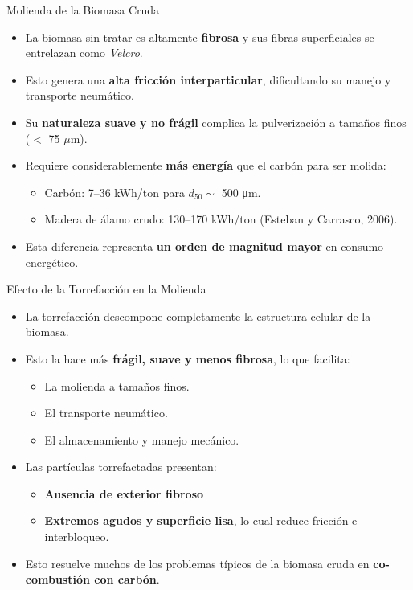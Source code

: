 \documentclass[main.tex]{subfiles}
\begin{document}
\begin{frame}{Molienda de la Biomasa Cruda}
\small
\begin{itemize}
    \item La biomasa sin tratar es altamente \textbf{fibrosa} y sus fibras superficiales se entrelazan como \textit{Velcro}.
    \item Esto genera una \textbf{alta fricción interparticular}, dificultando su manejo y transporte neumático.
    \item Su \textbf{naturaleza suave y no frágil} complica la pulverización a tamaños finos ($<$ 75 $\mu$m).
    \item Requiere considerablemente \textbf{más energía} que el carbón para ser molida:
    \begin{itemize}
        \item Carbón: 7–36 kWh/ton para $d_{50} \sim$ 500 μm.
        \item Madera de álamo crudo: 130–170 kWh/ton (Esteban y Carrasco, 2006).
    \end{itemize}
    \item Esta diferencia representa \textbf{un orden de magnitud mayor} en consumo energético.
\end{itemize}
\end{frame}

\begin{frame}{Efecto de la Torrefacción en la Molienda}
\small
\begin{itemize}
    \item La torrefacción descompone completamente la estructura celular de la biomasa.
    \item Esto la hace más \textbf{frágil, suave y menos fibrosa}, lo que facilita:
    \begin{itemize}
        \item La molienda a tamaños finos.
        \item El transporte neumático.
        \item El almacenamiento y manejo mecánico.
    \end{itemize}
    \item Las partículas torrefactadas presentan:
    \begin{itemize}
        \item \textbf{Ausencia de exterior fibroso}
        \item \textbf{Extremos agudos y superficie lisa}, lo cual reduce fricción e interbloqueo.
    \end{itemize}
    \item Esto resuelve muchos de los problemas típicos de la biomasa cruda en \textbf{co-combustión con carbón}.
\end{itemize}
\end{frame}
\end{document}

